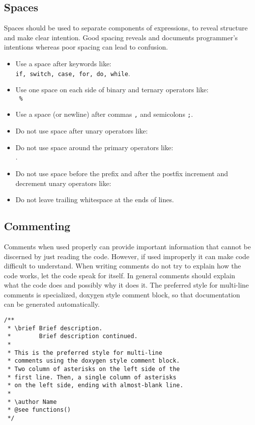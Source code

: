 \documentclass[11pt]{article}
\begin{document}
\subsection{Spaces}
Spaces should be used to separate components of expressions, to reveal structure and make clear intention. Good spacing reveals and documents programmer's intentions whereas poor spacing can lead to confusion. \cite{c_style} 
\begin{itemize}
	\item Use a space after keywords like:\\
	\texttt{if, switch, case, for, do, while}.
	\item Use one space on each side of binary and ternary operators like:\\
	\texttt{ \%}
	\item Use a space (or newline) after commas \texttt{,} and semicolons \texttt{;}.
	\item Do not use space after unary operators like:\\
	\texttt{}
	\item Do not use space around the primary operators like:\\
	\texttt{}.
	\item Do not use space before the prefix and after the postfix increment and decrement unary operators like:\\
	\texttt{\detokenize{++ --}}
	\item Do not leave trailing whitespace at the ends of lines.
\end{itemize}

\subsection{Commenting}
Comments when used properly can provide important information that cannot be discerned by just reading the code. However, if used improperly it can make code difficult to understand. When writing comments do not try to explain how the code works, let the code speak for itself. In general comments should explain what the code does and possibly why it does it. The preferred style for multi-line comments is specialized, doxygen style comment block, so that documentation can be generated automatically.

\begin{Verbatim}
/**
 * \brief Brief description.
 *        Brief description continued.
 * 
 * This is the preferred style for multi-line
 * comments using the doxygen style comment block.
 * Two column of asterisks on the left side of the
 * first line. Then, a single column of asterisks
 * on the left side, ending with almost-blank line.
 *
 * \author Name
 * @see functions()
 */
\end{Verbatim}
\end{document}
